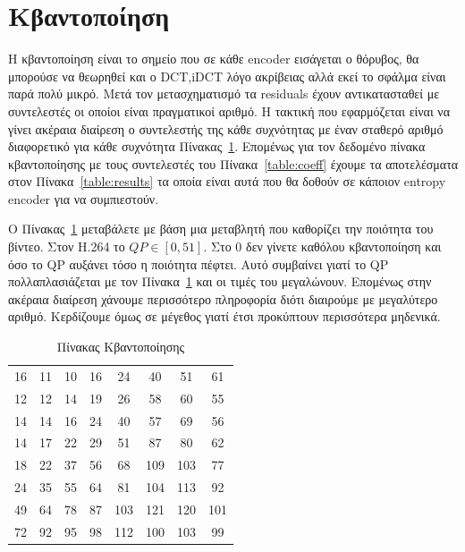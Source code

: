 \newpage
\section{Κβαντοποίηση}
\label{section:sect25}

\indent Η κβαντοποίηση είναι το σημείο που σε κάθε encoder εισάγεται ο θόρυβος, θα μπορούσε να θεωρηθεί και ο DCT,iDCT λόγο ακρίβειας αλλά εκεί το σφάλμα είναι παρά πολύ μικρό. Μετά τον μετασχηματισμό τα residuals έχουν αντικατασταθεί με συντελεστές οι οποίοι είναι πραγματικοί αριθμό. Η τακτική που εφαρμόζεται είναι να γίνει ακέραια διαίρεση ο συντελεστής της κάθε συχνότητας με έναν σταθερό αριθμό διαφορετικό για κάθε συχνότητα Πίνακας~\ref{table:quanttable}. Επομένως για τον δεδομένο πίνακα κβαντοποίησης με τους συντελεστές του Πίνακα~\ref{table:coeff} έχουμε τα αποτελέσματα στον Πίνακα~\ref{table:results} τα οποία είναι αυτά που θα δοθούν σε κάποιον entropy encoder για να συμπιεστούν.

\indent Ο Πίνακας~\ref{table:quanttable} μεταβάλετε με βάση μια μεταβλητή που καθορίζει την ποιότητα του βίντεο. Στον H.264 το $QP \in [0,51] $. Στο 0 δεν γίνετε καθόλου κβαντοποίηση και όσο το QP αυξάνει τόσο η ποιότητα πέφτει. Αυτό συμβαίνει γιατί το QP πολλαπλασιάζεται με τον Πίνακα~\ref{table:quanttable} και οι τιμές του μεγαλώνουν. Επομένως στην ακέραια διαίρεση χάνουμε περισσότερο πληροφορία διότι διαιρούμε με μεγαλύτερο αριθμό. Κερδίζουμε όμως σε μέγεθος γιατί έτσι προκύπτουν περισσότερα μηδενικά.

\begin{table}[H]
    \begin{center}
        \begin{tabular}{| c  c  c  c  c  c  c  c |}
        \hline
        16 & 11 & 10 & 16 & 24 & 40 & 51 & 61 \\
        12 & 12 & 14 & 19 & 26 & 58 & 60 & 55 \\
        14 & 14 & 16 & 24 & 40 & 57 & 69 & 56 \\
        14 & 17 & 22 & 29 & 51 & 87 & 80 & 62 \\
        18 & 22 & 37 & 56 & 68 & 109 & 103 & 77 \\
        24 & 35 & 55 & 64 & 81 & 104 & 113 & 92 \\
        49 & 64 & 78 & 87 & 103 & 121 & 120 & 101 \\
        72 & 92 & 95 & 98 & 112 & 100 & 103 & 99 \\
        \hline
        \end{tabular}
    \end{center}
    \caption{Πίνακας Κβαντοποίησης}
    \label{table:quanttable}
\end{table}

